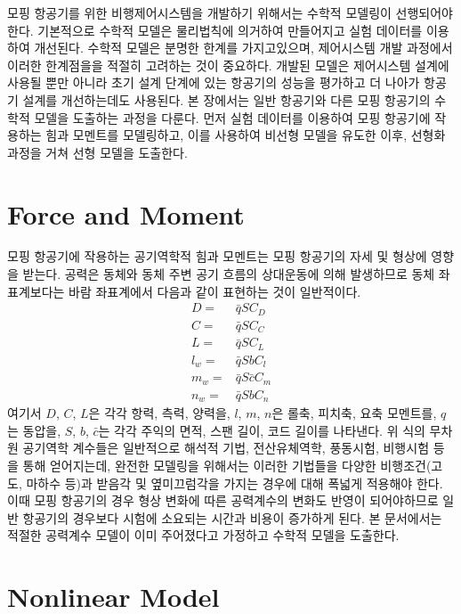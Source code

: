 \documentclass[a4paper, 12pt]{report}
\begin{document}
	모핑 항공기를 위한 비행제어시스템을 개발하기 위해서는 수학적 모델링이 선행되어야 한다. 
	기본적으로 수학적 모델은 물리법칙에 의거하여 만들어지고 실험 데이터를 이용하여 개선된다. 
	수학적 모델은 분명한 한계를 가지고있으며, 제어시스템 개발 과정에서 이러한 한계점을을 적절히 고려하는 것이 중요하다.
	개발된 모델은 제어시스템 설계에 사용될 뿐만 아니라 초기 설계 단계에 있는 항공기의 성능을 평가하고 더 나아가 항공기 설계를 개선하는데도 사용된다.
	본 장에서는 일반 항공기와 다른 모핑 항공기의 수학적 모델을 도출하는 과정을 다룬다.
	먼저 실험 데이터를 이용하여 모핑 항공기에 작용하는 힘과 모멘트를 모델링하고, 이를 사용하여 비선형 모델을 유도한 이후, 선형화 과정을 거쳐 선형 모델을 도출한다.
	
	\section{Force and Moment}
	
	모핑 항공기에 작용하는 공기역학적 힘과 모멘트는 모핑 항공기의 자세 및 형상에 영향을 받는다.
	공력은 동체와 동체 주변 공기 흐름의 상대운동에 의해 발생하므로 동체 좌표계보다는 바람 좌표계에서 다음과 같이 표현하는 것이 일반적이다.
	\begin{align}
		D =& \bar{q}SC_D \\
		C =& \bar{q}SC_C \\
		L =& \bar{q}SC_L \\
		l_w =& \bar{q}SbC_l \\
		m_w =& \bar{q}S\bar{c}C_m \\
		n_w =& \bar{q}SbC_n
	\end{align}
	여기서 $D$, $C$, $L$은 각각 항력, 측력, 양력을, $l$, $m$, $n$은 롤축, 피치축, 요축 모멘트를, $q$는 동압을, $S$, $b$, $\bar{c}$는 각각 주익의 면적, 스팬 길이, 코드 길이를 나타낸다.
	위 식의 무차원 공기역학 계수들은 일반적으로 해석적 기법, 전산유체역학, 풍동시험, 비행시험 등을 통해 얻어지는데, 완전한 모델링을 위해서는 이러한 기법들을 다양한 비행조건(고도, 마하수 등)과 받음각 및 옆미끄럼각을 가지는 경우에 대해 폭넓게 적용해야 한다.
	이때 모핑 항공기의 경우 형상 변화에 따른 공력계수의 변화도 반영이 되어야하므로 일반 항공기의 경우보다 시험에 소요되는 시간과 비용이 증가하게 된다.
	본 문서에서는 적절한 공력계수 모델이 이미 주어졌다고 가정하고 수학적 모델을 도출한다.
	
	\section{Nonlinear Model}
	
\end{document}
